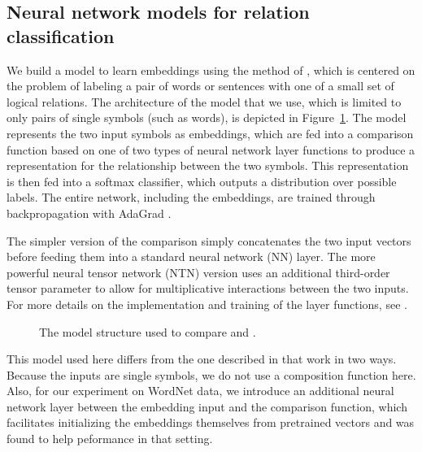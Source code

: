 
\subsection*{Neural network models for relation classification} \label{methods}

We build a model to learn embeddings using the method of
\citet{Bowman:Potts:Manning:2014}, which is centered on the problem of
labeling a pair of words or sentences with one of a small set of
logical relations. The architecture of the model that we use, which is
limited to only pairs of single symbols (such as words), is depicted
in Figure~\ref{sample-figure}. The model represents the two input
symbols as embeddings, which are fed into a comparison function based
on one of two types of neural network layer functions to produce a
representation for the relationship between the two symbols. This
representation is then fed into a softmax classifier, which outputs a
distribution over possible labels. The entire network, including the
embeddings, are trained through backpropagation with AdaGrad
\cite{duchi2011adaptive}. 

The simpler version of the comparison simply concatenates the two input
vectors before feeding them into a standard neural network (NN) layer.
The more powerful neural tensor network (NTN) version uses an additional 
third-order tensor parameter to allow for multiplicative
interactions between the two inputs. For more details on the implementation and
training of the layer functions, see \cite{Bowman:Potts:Manning:2014}.

\begin{figure}[tp]
  \centering
  
  \caption{The model structure used to compare  and .} 
  \label{sample-figure}
\end{figure}

This model used here differs from the one described in that work in
two ways. Because the inputs are single symbols, we do not use
a composition function here. Also, for our experiment on WordNet data, 
we introduce an additional neural network layer between the embedding 
input and the comparison function, which facilitates initializing the 
embeddings themselves from pretrained vectors and was found to help 
peformance in that setting.



